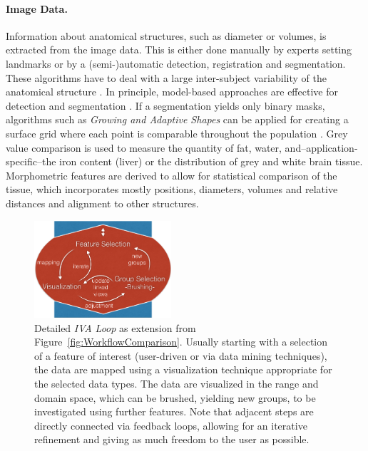 \documentclass[journal]{style/vgtc} 			          %
\begin{document}
\paragraph{Image Data. }
Information about anatomical structures, such as diameter or volumes, is extracted from the image data.
%
This is either done manually by experts setting landmarks or by a (semi-)automatic detection, registration and segmentation.
%
These algorithms have to deal with a large inter-subject variability of the anatomical structure \cite{Preim2014}.
%
In principle, model-based approaches are effective for detection \cite{Rak2013} and segmentation \cite{Gloger2010}. %
%
If a segmentation yields only binary masks, algorithms such as \emph{Growing and Adaptive Shapes} can be applied for creating a surface grid where each point is comparable throughout the population \cite{Ferrarini2007}.
%
Grey value comparison is used to measure the quantity of fat, water, and--application-specific--the iron content (liver) or the distribution of grey and white brain tissue.
%
Morphometric features are derived to allow for statistical comparison of the tissue, which incorporates mostly positions, diameters, volumes and relative distances and alignment to other structures.
\begin{figure}[htb]
 \centering
 \includegraphics[width=2.0in]{figures/InteractionLoop}
 \caption{Detailed \emph{IVA Loop} as extension from Figure~\ref{fig:WorkflowComparison}.
 Usually starting with a selection of a feature of interest (user-driven or via data mining techniques), the data are mapped using a visualization technique appropriate for the selected data types.
 The data are visualized in the range and domain space, which can be brushed, yielding new groups, to be investigated using further features.
 Note that adjacent steps are directly connected via feedback loops, allowing for an iterative refinement and giving as much freedom to the user as possible.}
 \label{fig:InteractionLoop}
\end{figure}
\end{document}
